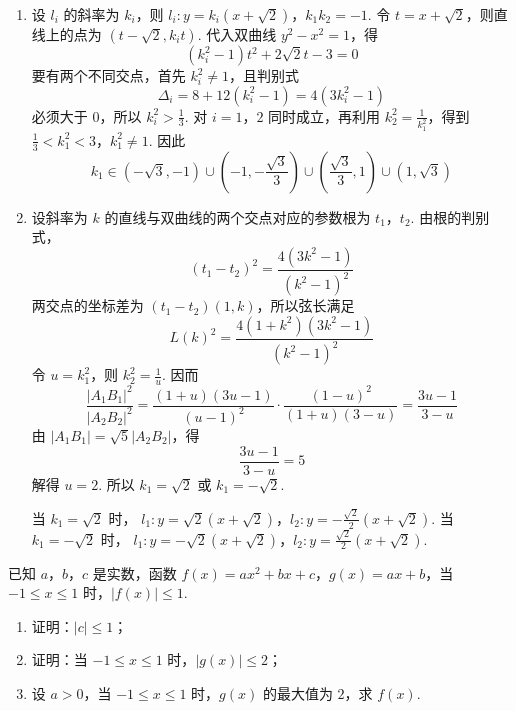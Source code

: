 \documentclass[UTF8,a4paper,oneside,11pt]{ctexbook}
\begin{document}
\begin{solution}
\begin{enumerate}
\item 设 \(l_i\) 的斜率为 \(k_i\)，则
\(l_i:y=k_i\left(x+\sqrt2\right)\)，\(k_1k_2=-1\).
令 \(t=x+\sqrt2\)，则直线上的点为 \((t-\sqrt2,k_it)\). 代入双曲线 \(y^2-x^2=1\)，得
\[
(k_i^2-1)t^2+2\sqrt2t-3=0
\]
要有两个不同交点，首先 \(k_i^2\neq1\)，且判别式
\[
\Delta_i=8+12(k_i^2-1)=4(3k_i^2-1)
\]
必须大于 \(0\)，所以 \(k_i^2>\frac13\). 对 \(i=1\)，\(2\) 同时成立，再利用 \(k_2^2=\frac{1}{k_1^2}\)，得到
\(\frac13<k_1^2<3\)，\(k_1^2\neq1\).
因此
\[
k_1\in\left(-\sqrt3,-1\right)\cup\left(-1,-\frac{\sqrt3}{3}\right)
\cup\left(\frac{\sqrt3}{3},1\right)\cup\left(1,\sqrt3\right)
\]

\item 设斜率为 \(k\) 的直线与双曲线的两个交点对应的参数根为 \(t_1\)，\(t_2\). 由根的判别式，
\[
(t_1-t_2)^2=\frac{4(3k^2-1)}{(k^2-1)^2}
\]
两交点的坐标差为 \((t_1-t_2)(1,k)\)，所以弦长满足
\[
L(k)^2=\frac{4(1+k^2)(3k^2-1)}{(k^2-1)^2}
\]
令 \(u=k_1^2\)，则 \(k_2^2=\frac{1}{u}\). 因而
\[
\frac{|A_1B_1|^2}{|A_2B_2|^2}
=\frac{(1+u)(3u-1)}{(u-1)^2}
\cdot\frac{(1-u)^2}{(1+u)(3-u)}
=\frac{3u-1}{3-u}
\]
由 \(|A_1B_1|=\sqrt5|A_2B_2|\)，得
\[
\frac{3u-1}{3-u}=5
\]
解得 \(u=2\). 所以 \(k_1=\sqrt2\) 或 \(k_1=-\sqrt2\).

当 \(k_1=\sqrt2\) 时，
\(l_1:y=\sqrt2\left(x+\sqrt2\right)\)，\(l_2:y=-\frac{\sqrt2}{2}\left(x+\sqrt2\right)\).
当 \(k_1=-\sqrt2\) 时，
\(l_1:y=-\sqrt2\left(x+\sqrt2\right)\)，\(l_2:y=\frac{\sqrt2}{2}\left(x+\sqrt2\right)\).
\end{enumerate}
\end{solution}

\begin{problem}
已知 \(a\)，\(b\)，\(c\) 是实数，函数 \(f(x) = ax^2 + bx + c\)，\(g(x) = ax + b\)，当 \(-1 \leqslant x \leqslant 1\) 时，\(\left|f(x)\right| \leqslant 1\).

\begin{enumerate}
\item 证明：\(\left|c\right| \leqslant 1\)；
\item 证明：当 \(-1 \leqslant x \leqslant 1\) 时，\(\left|g(x)\right| \leqslant 2\)；
\item 设 \(a > 0\)，当 \(-1 \leqslant x \leqslant 1\) 时，\(g(x)\) 的最大值为 \(2\)，求 \(f(x)\).
\end{enumerate}
\end{problem}
\end{document}
